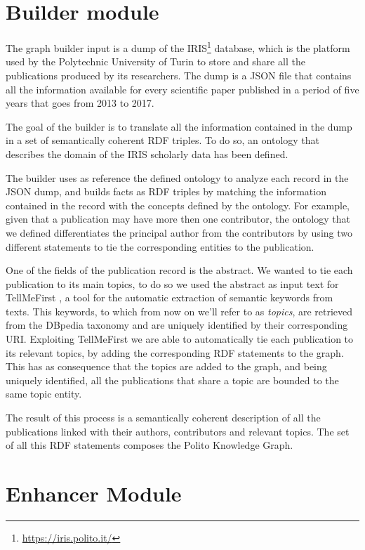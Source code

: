 \documentclass[%
    corpo=13.5pt,
    twoside,
    oldstyle,
    tipotesi=magistrale,
    greek,
    evenboxes
]{toptesi}
\begin{document}
\section{Builder module}

The graph builder input is a dump of the
IRIS\footnote{\url{https://iris.polito.it/}} database, which is the platform
used by the Polytechnic University of Turin to store and share all the
publications produced by its researchers. The dump is a JSON file that contains
all the information available for every scientific paper published in a period
of five years that goes from 2013 to 2017.

The goal of the builder is to translate all the information contained in the dump in a
set of semantically coherent RDF triples. To do so, an ontology that
describes the domain of the IRIS scholarly data has been defined.

The builder uses as reference the defined ontology to analyze each record in
the JSON dump, and builds facts as RDF triples by matching the information
contained in the record with the concepts defined by the ontology.
For example, given that a publication may have more then one contributor, the
ontology that we defined differentiates the principal author from the
contributors by using two different statements to tie the corresponding entities
to the publication.

One of the fields of the publication record is the abstract. We wanted to
tie each publication to its main topics, to do so we used the abstract
as input text for TellMeFirst \cite{rocha2015}, a tool for the automatic
extraction of semantic keywords from texts. This keywords, to which from now
on we'll refer to as \emph{topics}, are retrieved from the DBpedia taxonomy
and are uniquely identified by their corresponding URI.
Exploiting TellMeFirst we are able to automatically tie each publication to
its relevant topics, by adding the corresponding RDF statements to the graph.
This has as consequence that the topics are added to the graph, and being
uniquely identified, all the publications that share a topic are
bounded to the same topic entity.

The result of this process is a semantically coherent description of all the
publications linked with their authors, contributors and relevant topics.
The set of all this RDF statements composes the Polito Knowledge Graph.


\section{Enhancer Module}
\end{document}
